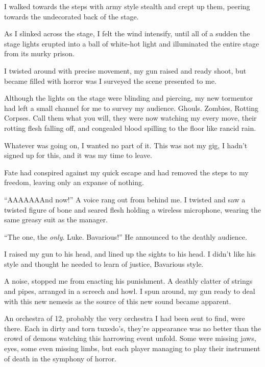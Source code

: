 I walked towards the steps with army style stealth and crept up
them, peering towards the undecorated back of the stage.

As I slinked across the stage, I felt the wind intensify, until all
of a sudden the stage lights erupted into a ball of white-hot light
and illuminated the entire stage from its murky prison.

I twisted around with precise movement, my gun raised and ready
shoot, but became filled with horror was I surveyed the scene
presented to me.



Although the lights on the stage were blinding and piercing, my new
tormentor had left a small channel for me to survey my audience.
Ghouls. Zombies, Rotting Corpses. Call them what you will, they
were now watching my every move, their rotting flesh falling off,
and congealed blood spilling to the floor like rancid rain.

Whatever was going on, I wanted no part of it. This was not my gig,
I hadn't signed up for this, and it was my time to
leave.

Fate had conspired against my quick escape and had removed the
steps to my freedom, leaving only an expanse of nothing.



``AAAAAAAnd now!'' A voice rang out from behind me. I
twisted and saw a twisted figure of bone and seared flesh holding a
wireless microphone, wearing the same greasy suit as the
manager.

``The one, the {\em only}. Luke. Bavarious!'' He announced to
the deathly audience.

I raised my gun to his head, and lined up the sights to his head. I
didn't like his style and thought he needed to learn of
justice, Bavarious style.



A noise, stopped me from enacting his punishment. A deathly clatter
of strings and pipes, arranged in a screech and howl. I spun
around, my gun ready to deal with this new nemesis as the source of
this new sound became apparent.

An orchestra of 12, probably the very orchestra I had been sent to
find, were there. Each in dirty and torn tuxedo's,
they're appearance was no better than the crowd of demons
watching this harrowing event unfold. Some were missing jaws, eyes,
some even missing limbs, but each player managing to play their
instrument of death in the symphony of horror.



